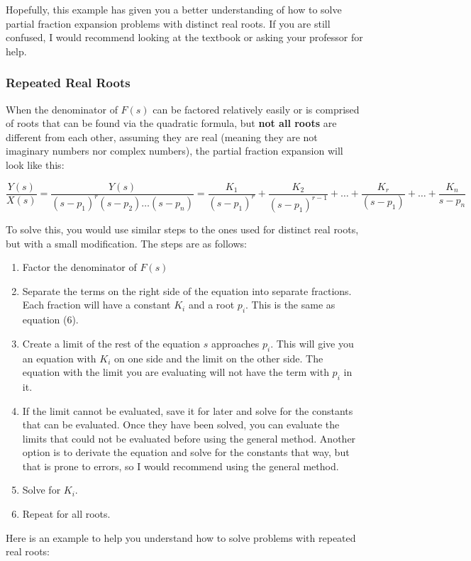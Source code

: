 \documentclass{article}
\theoremstyle{mytheoremstyle}
\theoremstyle{mytheoremstyle}
\theoremstyle{myproblemstyle}
\theoremstyle{break}
\begin{document}
Hopefully, this example has given you a better understanding of how to solve partial fraction expansion problems with distinct real roots. If you are still confused, I would recommend looking at the textbook or asking your professor for help.


\subsubsection{Repeated Real Roots}

When the denominator of $F(s)$ can be factored relatively easily or is comprised of roots that can be found via the quadratic formula, but \textbf{not all roots} are different from each other, assuming they are real (meaning they are not imaginary numbers nor complex numbers), the partial fraction expansion will look like this:

\begin{equation}
	\frac{Y(s)}{X(s)} = \frac{Y(s)}{(s-p_1)^{r}(s-p_2) \ldots (s-p_n)} = \frac{K_1}{(s-p_1)^r} + \frac{K_2}{(s-p_1)^{r-1}} + \ldots + \frac{K_{r}}{(s-p_1)} + \ldots + \frac{K_n}{s-p_n}
\end{equation}

To solve this, you would use similar steps to the ones used for distinct real roots, but with a small modification. The steps are as follows:
\begin{enumerate}
	\item Factor the denominator of $F(s)$
	\item Separate the terms on the right side of the equation into separate fractions. Each fraction will have a constant $K_i$ and a root $p_i$. This is the same as equation (6).
	\item Create a limit of the rest of the equation $s$ approaches $p_i$. This will give you an equation with $K_i$ on one side and the limit on the other side. The equation with the limit you are evaluating will not have the term with $p_i$ in it.
	\item If the limit cannot be evaluated, save it for later and solve for the constants that can be evaluated. Once they have been solved, you can evaluate the limits that could not be evaluated before using the general method. Another option is to derivate the equation and solve for the constants that way, but that is prone to errors, so I would recommend using the general method.
	\item Solve for $K_i$.
	\item Repeat for all roots.
\end{enumerate}
Here is an example to help you understand how to solve problems with repeated real roots:
\end{document}

